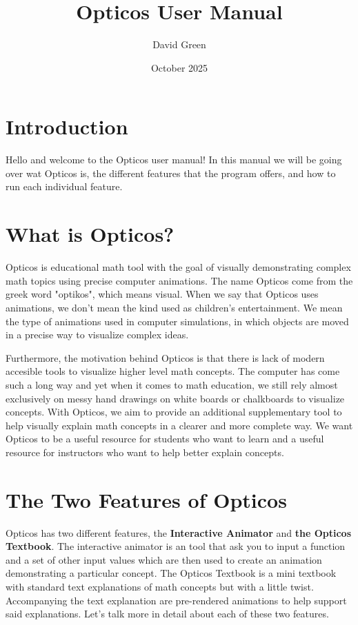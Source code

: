 \documentclass{article}
\title{Opticos User Manual}
\author{David Green}
\date{October 2025}
\begin{document}
\maketitle

\section*{Introduction}
Hello and welcome to the Opticos user manual! In this manual we will be going over wat Opticos is, the different features that the program offers, and how to run each individual feature.

\section*{What is Opticos?}
Opticos is educational math tool with the goal of visually demonstrating complex math topics using precise computer animations. The name Opticos come from the greek word "optikos", which means visual. When we say that Opticos uses animations, we don't mean the kind used as children's entertainment. We mean the type of animations used in computer simulations, in which objects are moved in a precise way to visualize complex ideas.
\bigskip

Furthermore, the motivation behind Opticos is that there is lack of modern accesible tools to visualize higher level math concepts. The computer has come such a long way and yet when it comes to math education, we still rely almost exclusively on messy hand drawings on white boards or chalkboards to visualize concepts. With Opticos, we aim to provide an additional supplementary tool to help visually explain math concepts in a clearer and more complete way. We want Opticos to be a useful resource for students who want to learn and a useful resource for instructors who want to help better explain concepts.

\section*{The Two Features of Opticos}
Opticos has two different features, the \textbf{Interactive Animator} and \textbf{the Opticos Textbook}. The interactive animator is an tool that ask you to input a function and a set of other input values which are then used to create an animation demonstrating a particular concept. The Opticos Textbook is a mini textbook with standard text explanations of math concepts but with a little twist. Accompanying the text explanation are pre-rendered animations to help support said explanations. Let's talk more in detail about each of these two features.
\pagebreak
\end{document}
